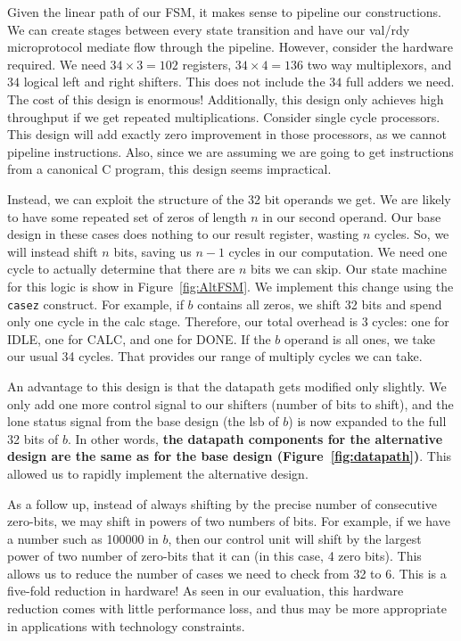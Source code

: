 \documentclass[10pt]{article}
\begin{document}
Given the linear path of our FSM, it makes sense to pipeline our constructions.
We can create stages between every state transition and have our val/rdy microprotocol mediate flow through the pipeline.
However, consider the hardware required. We need $34 \times 3 = 102$ registers, $34 \times 4 = 136$ two way multiplexors,
and $34$ logical left and right shifters.
This does not include the $34$ full adders we need. 
The cost of this design is enormous!
Additionally, this design only achieves high throughput if we get repeated multiplications.
Consider single cycle processors.
This design will add exactly zero improvement in those processors, as we cannot pipeline instructions. 
Also, since we are assuming we are going to get instructions from a canonical C program, this design seems impractical.

Instead, we can exploit the structure of the 32 bit operands we get.
We are likely to have some repeated set of zeros of length $n$ in our second operand.
Our base design in these cases does nothing to our result register, wasting $n$ cycles.
So, we will instead shift $n$ bits, saving us $n-1$ cycles in our computation.
We need one cycle to actually determine that there are $n$ bits we can skip.
Our state machine for this logic is show in Figure~\ref{fig:AltFSM}.
We implement this change using the \verb+casez+ construct.
For example, if $b$ contains all zeros, we shift 32 bits and spend only one cycle in the calc stage.
Therefore, our total overhead is 3 cycles: one for IDLE, one for CALC, and one for DONE.
If the $b$ operand is all ones, we take our usual 34 cycles.
That provides our range of multiply cycles we can take.

An advantage to this design is that the datapath gets modified only slightly.
We only add one more control signal to our shifters (number of bits to shift), and the lone status signal from the base design (the lsb of $b$) is now expanded to the full 32 bits of $b$.
In other words, \textbf{the datapath components for the alternative design are the same as for the base design (Figure~\ref{fig:datapath})}. 
This allowed us to rapidly implement the alternative design.

As a follow up, instead of always shifting by the precise number of consecutive zero-bits, we may shift in powers of two numbers of bits. For example, if we have a number such as 100000 in $b$, then our control unit will shift by the largest power of two number of zero-bits that it can (in this case, 4 zero bits).
This allows us to reduce the number of cases we need to check from 32 to 6.
This is a five-fold reduction in hardware! As seen in our evaluation, this hardware reduction comes with little performance loss, and thus may be more appropriate in applications with technology constraints.
\end{document}
